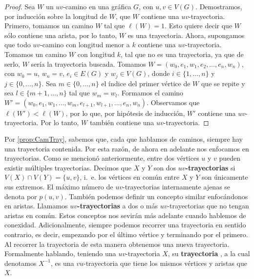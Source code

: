 \begin{proof}
    Sea $W$ un $uv$-camino en una gr\'afica $G$, con $u,v \in V(G)$.
    Demostramos, por inducci\'on sobre la longitud de $W$, que $W$ contiene una
    $uv$-trayectoria. Primero, tomamos un camino $W$ tal que $\ell(W)=1$. Esto
    quiere decir que $W$ s\'olo contiene una arista, por lo tanto, $W$ es una
    trayectoria. Ahora, supongamos que todo $uv$-camino con longitud menor a $k$
    contiene una $uv$-trayectoria. Tomamos un camino $W$ con longitud $k$, tal
    que no es una trayectoria, ya que de serlo, $W$ ser\'ia la trayectoria
    buscada. Tomamos $W= (w_0,e_1,w_1,e_2, \dots, e_n,w_n)$, con $w_0=u$,
    $w_n=v$, $e_i \in E(G)$ y $w_j \in V(G)$, donde $i \in \{1, \dots, n\}$ y $j
    \in \{0, \dots, n\}$. Sea $m \in \{0, \dots, n\}$ el \'indice del primer
    v\'ertice de $W$ que se repite y sea $l \in \{m+1, \dots, n\}$ tal que $w_m
    = w_l$. Formamos el camino $W'= (w_0,e_1,w_1,\dots, w_m, e_{l+1}, w_{l+1},
    \dots, e_n,w_n)$. Observamos que $\ell(W')<\ell(W)$, por lo que, por
    hip\'otesis de inducci\'on, $W'$ contiene una $uv$-trayectoria. Por lo
    tanto, $W$ tambi\'en contiene una $uv$-trayectoria.
\end{proof}

Por \cref{prop:CamTray}, sabemos que, cada que hablamos de caminos, siempre hay
una trayectoria contenida. Por esta raz\'on, de ahora en adelante nos enfocamos
en trayectorias. Como se mencion\'o anteriormente, entre dos v\'ertices $u$ y
$v$ pueden existir m\'ultiples trayectorias. Decimos que $X$ y $Y$ son dos
\textbf{$uv$-trayectorias} 
si $V(X)\cap V(Y)=\{u,v\}$, i.~e. los v\'ertices en com\'un entre $X$ y $Y$ son
\'unicamente sus extremos. El m\'aximo n\'umero de $uv$-trayectorias
internamente ajenas se denota por $p(u,v)$. Tambi\'en podemos definir un
concepto similar enfoc\'andonos en aristas. Llamamos \textbf{$uv$-trayectorias}
 a dos o m\'as
$uv$-trayectorias que no tengan aristas en com\'un. Estos conceptos nos
sevir\'an m\'as adelante cuando hablemos de conexidad. Adicionalmente, siempre
podemos recorrer una trayectoria en sentido contrario, es decir, empezando por
el \'ultimo v\'ertice y terminando por el primero. Al recorrer la trayectoria de
esta manera obtenemos una nueva trayectoria. Formalmente hablando, teniendo una
$uv$-trayectoria $X$, su \textbf{trayectoria} ,
a la cual denotamos $X^{-1}$, es una $vu$-trayectoria que tiene los mismos
v\'ertices y aristas que $X$.


